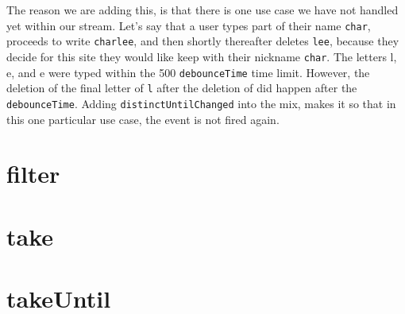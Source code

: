 The reason we are adding this, is that there is one use case we have not
handled yet within our stream. Let's say that a user types part of their 
name \texttt{char}, proceeds to write \texttt{charlee}, and then shortly
thereafter deletes \texttt{lee}, because they decide for this site they 
would like keep with their nickname \texttt{char}. The letters l, e, and
e were typed within the 500 \lstinline{debounceTime} time limit. However, 
the deletion of the final letter of \texttt{l} after the deletion of 
 did happen after the \lstinline{debounceTime}. Adding 
\lstinline{distinctUntilChanged} into the mix, makes it so that in this one 
particular use case, the event is not fired again. 

\section{filter} 

\section{take} 

\section{takeUntil}